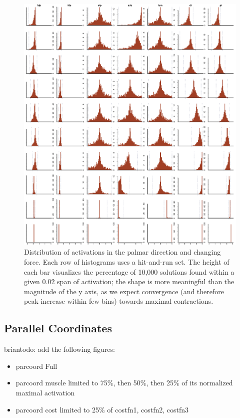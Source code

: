 \begin{figure}[htbp]
\centering
\includegraphics[width=\textwidth]{figs/Z_alphaProgression1430924065026.pdf}
\caption{Distribution of activations in the palmar direction and changing force. Each row of histograms uses a hit-and-run set. The height of each bar visualizes the percentage of 10,000 solutions found within a given 0.02 span of activation; the shape is more meaningful than the magnitude of the y axis, as we expect convergence (and therefore peak increase within few bins) towards maximal contractions.}
\label{fig:XY_progression}
\end{figure}

\subsection{Parallel Coordinates} %
\label{sub:parallel_coordinates}
briantodo: add the following figures:
\begin{itemize}
	\item{parcoord Full}
	\item{parcoord muscle limited to 75\%, then 50\%, then 25\% of its normalized maximal activation}
	\item{parcoord cost limited to 25\% of costfn1, costfn2, costfn3}
\end{itemize}


